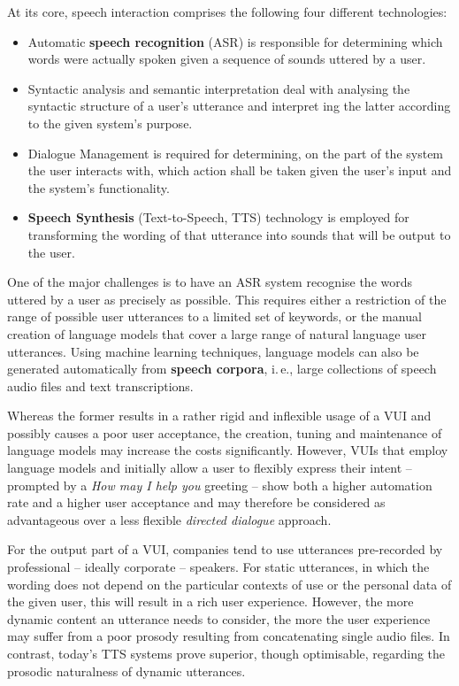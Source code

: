 \begin{multicols}{2}
At its core, speech interaction comprises the following four different technologies:
\begin{itemize}
\item Automatic \textbf{speech recognition} (ASR) is responsible for determining which words were actually spoken given a sequence of sounds uttered by a user.
\item Syntactic analysis and semantic interpretation deal with analysing the syntactic structure of a user’s utterance and interpret
ing the latter according to the given system’s purpose.
\item Dialogue Management is required for determining, on the part of the system the user interacts with, which action shall be taken given the user’s input and the system’s functionality.
\item \textbf{Speech Synthesis} (Text-to-Speech, TTS) technology is employed for transforming the wording of that utterance into sounds that will be output to the user. 
\end{itemize}
One of the major challenges is to have an ASR system recognise the words uttered by a user as precisely as possible. This requires either a restriction of the range of possible user utterances to a limited set of keywords, or the manual creation of language models that cover a large range of natural language user utterances.  Using machine learning techniques, language models can also be generated automatically from \textbf{speech corpora}, i.\,e., large collections of speech audio files and text transcriptions.

Whereas the former results in a rather rigid and inflexible usage of a VUI and possibly causes a poor user acceptance, the creation, tuning and maintenance of language models may increase the costs significantly. However, VUIs that employ language models and initially allow a user to flexibly express their intent – prompted by a \textit{How may I help you} greeting – show both a higher automation rate and a higher user acceptance and may therefore be considered as advantageous over a less flexible \textit{directed dialogue} approach.


For the output part of a VUI, companies tend to use utterances pre-recorded by professional – ideally corporate – speakers. For static utterances, in which the wording does not depend on the particular contexts of use or the personal data of the given user, this will result in a rich user experience. However, the more dynamic content an utterance needs to consider, the more the user experience may suffer from a poor prosody resulting from concatenating single audio files. In contrast, today’s TTS systems prove superior, though optimisable, regarding the prosodic naturalness of dynamic utterances.  


\end{multicols}
